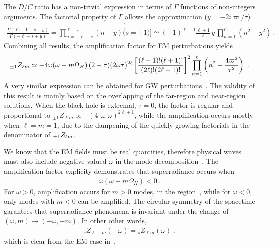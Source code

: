 The $D/C$ ratio has a non-trivial expression in terms of $\Gamma$ functions of non-integers arguments. The factorial property of $\Gamma$ allows the approximation ($y = - 2 i \varpi/\tau$)
\begin{align}
    \frac{\Gamma(\ell+1-s + y)}{\Gamma(-\ell - s + y)} = \prod_{n=-\ell-s}^{\ell-s} (n + y) \stackrel[(s=\pm 1)]{}{\simeq} (-1)^{\ell+1} \frac{\ell+1}{\ell} \, y \,\prod_{n=1}^{\ell} (n^2 - y^2) ~.
\end{align}
Combining all results, the amplification factor for EM perturbations yields
\begin{align}
    \label{eq3:ZfactorEM}
    \uu[\pm1]{Z}{\ell m} \simeq  - 4 \bar{\omega} (\bar{\omega} - m \bar{\Omega}_H) \,(2-\tau)(2\bar{\omega} \tau)^{2\ell} \left[\frac{(\ell-1)! (\ell+1)!}{(2\ell)! (2\ell+1)!}\right]^2 \prod_{n=1}^{\ell} \left(n^2 + \frac{4 \varpi^2}{\tau^2} \right) ~.
\end{align}
A very similar expression can be obtained for GW perturbations~\cite{Rosa2016}.
The validity of this result is mainly based on the overlapping of the far-region and near-region solutions.
When the black hole is extremal, $\tau=0$, the factor is regular and proportional to ${}_{\pm1}Z_{\ell m}\propto - (4 \varpi \bar{\omega})^{2\ell+1}$, while the amplification occurs mostly when $\ell=m=1$, due to the dampening of the quickly growing factorials in the denominator of $\uu[\pm1]{Z}{\ell m}$.

We know that the EM fields must be real quantities, therefore physical waves must also include negative valued $\omega$ in the mode decomposition~.
The amplification factor explicity demonstrates that superradiance occurs when
\begin{align}
    \omega(\omega-m\Omega_H)<0 ~.
\end{align}
For $\omega>0$, amplification occurs for $m>0$ modes, in the region~, while for $\omega<0$, only modes with $m<0$ can be amplified.
The circular symmetry of the spacetime garantees that superradiance phenomena is invariant under the change of $(\omega,m)\to(-\omega,-m)$.
In other other words,
\begin{align}
    {}_{s}Z_{\ell-m}(-\omega) = {}_{s}Z_{\ell m}(\omega) ~,
\end{align}
which is clear from the EM case in~.


\cleardoublepage